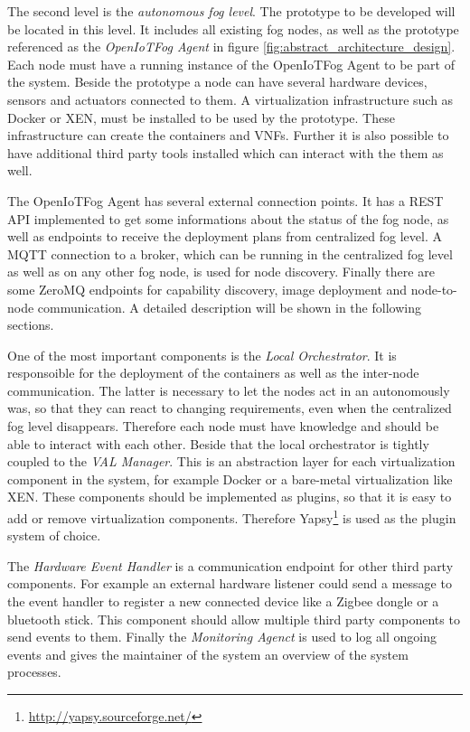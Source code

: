 The second level is the \textit{autonomous fog level}.
The prototype to be developed will be located in this level.
It includes all existing fog nodes, as well as the prototype referenced as the \textit{OpenIoTFog Agent} in figure \ref{fig:abstract_architecture_design}.
Each node must have a running instance of the OpenIoTFog Agent to be part of the system.
Beside the prototype a node can have several hardware devices, sensors and actuators connected to them.
A virtualization infrastructure such as Docker or XEN, must be installed to be used by the prototype.
These infrastructure can create the containers and \acp{VNF}.
Further it is also possible to have additional third party tools installed which can interact with the them as well.

The OpenIoTFog Agent has several external connection points.
It has a \ac{REST} \ac{API} implemented to get some informations about the status of the fog node, as well as endpoints to receive the deployment plans from centralized fog level.
A \ac{MQTT} connection to a broker, which can be running in the centralized fog level as well as on any other fog node, is used for node discovery.
Finally there are some ZeroMQ endpoints for capability discovery, image deployment and node-to-node communication.
A detailed description will be shown in the following sections.

One of the most important components is the \textit{Local Orchestrator}.
It is responsoible for the deployment of the containers as well as the inter-node communication.
The latter is necessary to let the nodes act in an autonomously was, so that they can react to changing requirements, even when the centralized fog level disappears.
Therefore each node must have knowledge and should be able to interact with each other.
Beside that the local orchestrator is tightly coupled to the \textit{\ac{VAL} Manager}.
This is an abstraction layer for each virtualization component in the system, for example Docker or a bare-metal virtualization like XEN.
These components should be implemented as plugins, so that it is easy to add or remove virtualization components.
Therefore Yapsy\footnote{\url{http://yapsy.sourceforge.net/}} is used as the plugin system of choice.

The \textit{Hardware Event Handler} is a communication endpoint for other third party components.
For example an external hardware listener could send a message to the event handler to register a new connected device like a Zigbee dongle or a bluetooth stick.
This component should allow multiple third party components to send events to them.
Finally the \textit{Monitoring Agenct} is used to log all ongoing events and gives the maintainer of the system an overview of the system processes.

